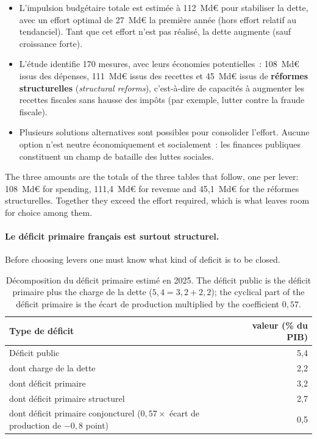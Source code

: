 \begin{itemize}
  \item L'impulsion budgétaire totale est estimée à 112~Md€ pour stabiliser la
    dette, avec un effort optimal de 27~Md€ la première année (hors effort
    relatif au tendanciel). Tant que cet effort n'est pas réalisé, la dette
    augmente (sauf croissance forte).
  \item L'étude identifie 170 mesures, avec leurs économies potentielles~:
    108~Md€ issus des dépenses, 111~Md€ issus des recettes et 45~Md€ issus de
    \textbf{réformes structurelles} (\textit{structural reforms}), c'est-à-dire
    de capacités à augmenter les recettes fiscales sans hausse des impôts (par
    exemple, lutter contre la fraude fiscale).
  \item Plusieurs solutions alternatives sont possibles pour consolider
    l'effort. Aucune option n'est neutre économiquement et socialement~: les
    finances publiques constituent un champ de bataille des luttes sociales.
\end{itemize}
The three amounts are the totals of the three tables that follow, one per lever:
108~Md€ for spending, 111,4~Md€ for revenue and 45,1~Md€ for the réformes
structurelles. Together they exceed the effort required, which is what leaves room
for choice among them.

\paragraph{Le déficit primaire français est surtout structurel.}
Before choosing levers one must know what kind of deficit is to be closed.\\

\begin{table}[h!]
  \centering
  \small
  \begin{tabular}{@{}lr@{}}
    \toprule
    Type de déficit & valeur (\% du PIB) \\
    \midrule
    Déficit public & 5,4 \\
    \quad dont charge de la dette & 2,2 \\
    \quad dont déficit primaire & 3,2 \\
    \qquad dont déficit primaire structurel & 2,7 \\
    \qquad dont déficit primaire conjoncturel
      ($0{,}57 \times$ écart de production de $-0{,}8$ point) & 0,5 \\
    \bottomrule
  \end{tabular}
  \caption*{\small Décomposition du déficit primaire estimé en 2025. The
    déficit public is the déficit primaire plus the charge de la dette
    ($5{,}4 = 3{,}2 + 2{,}2$); the cyclical part of the déficit primaire is the
    écart de production multiplied by the coefficient $0{,}57$.}
\end{table}

